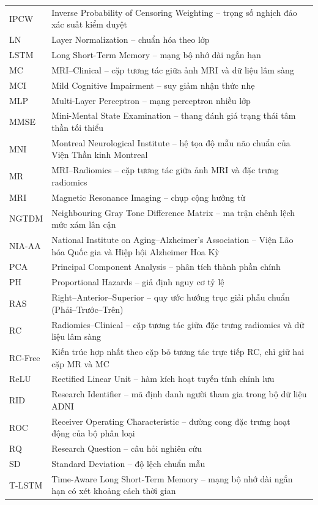 {\begin{longtable}{@{}L{2.5cm}L{12.7cm}@{}}
IPCW & Inverse Probability of Censoring Weighting -- trọng số nghịch đảo xác suất kiểm duyệt \\
LN & Layer Normalization -- chuẩn hóa theo lớp \\
LSTM & Long Short-Term Memory -- mạng bộ nhớ dài ngắn hạn \\
MC & MRI--Clinical -- cặp tương tác giữa ảnh MRI và dữ liệu lâm sàng \\
MCI & Mild Cognitive Impairment -- suy giảm nhận thức nhẹ \\
MLP & Multi-Layer Perceptron -- mạng perceptron nhiều lớp \\
MMSE & Mini-Mental State Examination -- thang đánh giá trạng thái tâm thần tối thiểu \\
MNI & Montreal Neurological Institute -- hệ tọa độ mẫu não chuẩn của Viện Thần kinh Montreal \\
MR & MRI--Radiomics -- cặp tương tác giữa ảnh MRI và đặc trưng radiomics \\
MRI & Magnetic Resonance Imaging -- chụp cộng hưởng từ \\
NGTDM & Neighbouring Gray Tone Difference Matrix -- ma trận chênh lệch mức xám lân cận \\
NIA-AA & National Institute on Aging--Alzheimer's Association -- Viện Lão hóa Quốc gia và Hiệp hội Alzheimer Hoa Kỳ \\
PCA & Principal Component Analysis -- phân tích thành phần chính \\
PH & Proportional Hazards -- giả định nguy cơ tỷ lệ \\
RAS & Right--Anterior--Superior -- quy ước hướng trục giải phẫu chuẩn (Phải--Trước--Trên) \\
RC & Radiomics--Clinical -- cặp tương tác giữa đặc trưng radiomics và dữ liệu lâm sàng \\
RC-Free & Kiến trúc hợp nhất theo cặp bỏ tương tác trực tiếp RC, chỉ giữ hai cặp MR và MC \\
ReLU & Rectified Linear Unit -- hàm kích hoạt tuyến tính chỉnh lưu \\
RID & Research Identifier -- mã định danh người tham gia trong bộ dữ liệu ADNI \\
ROC & Receiver Operating Characteristic -- đường cong đặc trưng hoạt động của bộ phân loại \\
RQ & Research Question -- câu hỏi nghiên cứu \\
SD & Standard Deviation -- độ lệch chuẩn mẫu \\
T-LSTM & Time-Aware Long Short-Term Memory -- mạng bộ nhớ dài ngắn hạn có xét khoảng cách thời gian \\
\bottomrule
\end{longtable}\par
}
